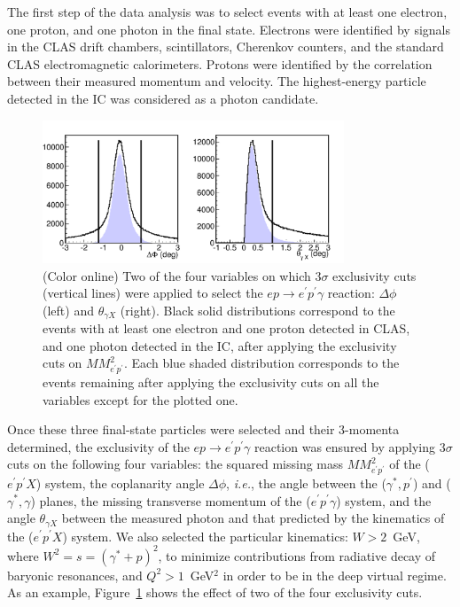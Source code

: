 \documentclass[nofootinbib,twocolumn,showpacs,prl,superscriptaddress,secnumarabic,amssymb,nobibnotes,aps,floatfix]{revtex4-1}
\begin{document}
The first step of the data analysis was to select events with at least one electron, one proton, and
one photon in the final state.
Electrons were identified by signals in the CLAS drift chambers, scintillators,
Cherenkov counters, and the standard CLAS electromagnetic calorimeters. Protons
were identified by the correlation between their measured momentum and velocity.
The highest-energy particle detected in the IC was considered as a photon candidate.
\begin{figure}[htb]
\vspace{-0.2cm}
\includegraphics[width=9cm]{fig2.pdf}
\vspace{-0.7cm}
\caption{(Color online) Two of the four variables on which $3\sigma$ exclusivity cuts (vertical lines)
were applied to select the $ep\to e^\prime p^\prime \gamma$ reaction: $\Delta \phi$ (left)
and $\theta_{\gamma X}$ (right). 
Black solid distributions correspond to the events with at least one electron and one proton detected
in CLAS, and one photon detected in the IC, after applying the exclusivity cuts on $MM^{2}_{e^\prime p^\prime}$.
Each blue shaded distribution corresponds to the events remaining after
applying the exclusivity cuts on all the variables except for the plotted one.}
\label{fig:cuts}
\end{figure}
Once these three final-state particles were selected and their 3-momenta determined,
the exclusivity of the $ep\to e^\prime p^\prime \gamma$ reaction was ensured by applying $3\sigma$ cuts
on the following four variables: the squared missing mass $MM^{2}_{e^\prime p^\prime}$ of the 
($e^\prime p^\prime X$) system, the coplanarity angle $\Delta \phi$, \textit{i.e.}, the angle between 
the ($\gamma^*,p^\prime$) and ($\gamma^*,\gamma$) planes, the missing transverse momentum of the
($e^\prime p^\prime \gamma$) system, and the angle $\theta_{\gamma X}$ between the measured photon and that
predicted by the kinematics of the ($e^\prime p^\prime X$) system. We also selected the particular kinematics:
$W>2$~GeV, where $W^2=s=(\gamma^*+p)^2$, to minimize contributions from radiative decay of
baryonic resonances, and $Q^2>1$~GeV$^2$ in order to be in the deep virtual regime.
As an example, Figure~\ref{fig:cuts} shows the effect of two of the four exclusivity cuts.
\end{document}
